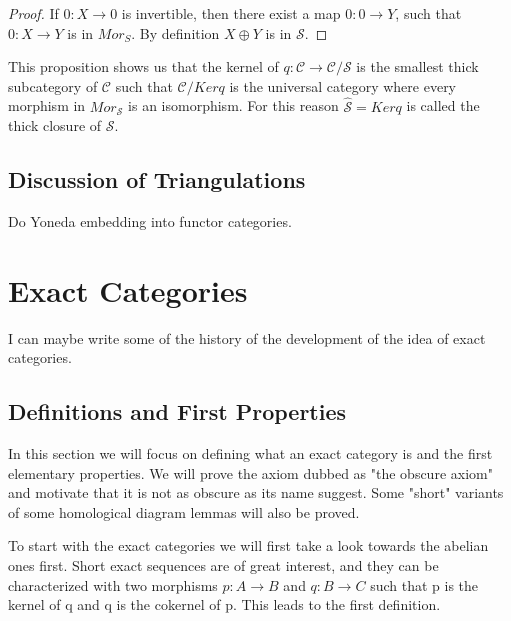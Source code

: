 \documentclass[12pt]{article}
\theoremstyle{definition}
\theoremstyle{remark}
\begin{document}
            \begin{proof}
                If $0:X\rightarrow 0$ is invertible, then there exist a map $0:0\rightarrow Y$, such that $0:X\rightarrow Y$ is in $Mor_S$. By definition $X\oplus Y$ is in $\mathcal{S}$.
            \end{proof}

            This proposition shows us that the kernel of $q:\mathcal{C}\rightarrow\mathcal{C}/\mathcal{S}$ is the smallest thick subcategory of $\mathcal{C}$ such that $\mathcal{C}/Kerq$ is the universal category where every morphism in $Mor_\mathcal{S}$ is an isomorphism. For this reason $\widehat{\mathcal{S}}=Kerq$ is called the thick closure of $\mathcal{S}$.

        \subsection{Discussion of Triangulations}
            Do Yoneda embedding into functor categories.
    
    \clearpage
    
    \section{Exact Categories}
            
        I can maybe write some of the history of the development of the idea of exact categories. 

        \subsection{Definitions and First Properties}

            In this section we will focus on defining what an exact category is and the first elementary properties. We will prove the axiom dubbed as "the obscure axiom" and motivate that it is not as obscure as its name suggest. Some "short" variants of some homological diagram lemmas will also be proved.

            To start with the exact categories we will first take a look towards the abelian ones first. Short exact sequences are of great interest, and they can be characterized with two morphisms $p:A\rightarrow B$ and $q:B\rightarrow C$ such that p is the kernel of q and q is the cokernel of p. This leads to the first definition.
\end{document}
